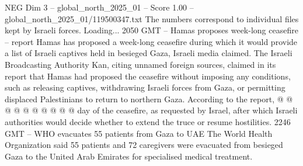 \begin{textsample}{NEG Dim 3 – global\_north\_2025\_01 – Score 1.00 – global\_north\_2025\_01/119500347.txt}
The numbers correspond to individual files kept by Israeli forces.
Loading... 2050 GMT -- Hamas proposes week-long ceasefire -- report Hamas has proposed a week-long ceasefire during which it would provide a list of Israeli captives held in besieged Gaza, Israeli media claimed.
The Israeli Broadcasting Authority Kan, citing unnamed foreign sources, claimed in its report that Hamas had proposed the ceasefire without imposing any conditions, such as releasing captives, withdrawing Israeli forces from Gaza, or permitting displaced Palestinians to return to northern Gaza.
According to the report, @ @ @ @ @ @ @ @ @ @ day of the ceasefire, as requested by Israel, after which Israeli authorities would decide whether to extend the truce or resume hostilities. 2246 GMT -- WHO evacuates 55 patients from Gaza to UAE The World Health Organization said 55 patients and 72 caregivers were evacuated from besieged Gaza to the United Arab Emirates for specialised medical treatment.

\end{textsample}
